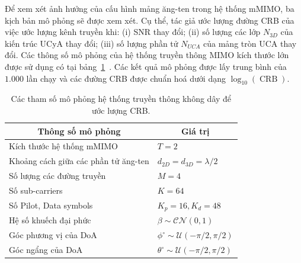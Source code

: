 Để xem xét ảnh hưởng của cấu hình mảng ăng-ten trong hệ thống mMIMO, ba kịch bản mô phỏng sẽ được xem xét. Cụ thể, tác giả ước lượng đường CRB của việc ước lượng kênh truyền khi: (i) SNR thay đổi; (ii) số lượng các lớp $N_{3D}$ của kiến trúc UCyA thay đổi; (iii) số lượng phần tử $N_{UCA}$ của mảng tròn UCA thay đổi. Các thông số mô phỏng của hệ thống truyền thông MIMO kích thước lớn được sử dụng có tại bảng~\ref{tab:simulation_param_CRB}~\cite{Swindlehurst2022}. Các kết quả mô phỏng được lấy trung bình của $1.000$ lần chạy và các đường CRB được chuẩn hoá dưới dạng $\log_{10} (\operatorname{CRB})$.
\begin{table}[ht]
\centering
\caption{Các tham số mô phỏng hệ thống truyền thông không dây để ước lượng CRB.}
\label{tab:simulation_param_CRB}
\begin{tabular}{p{8cm} | p{6cm}}
\hline
\hline
\multicolumn{1}{c|}{\textbf{Thông số mô phỏng}} & \multicolumn{1}{c}{\textbf{Giá trị}} \\ \hline
Kích thước hệ thống mMIMO                            & $T = 2$      \\ \hline
Khoảng cách giữa các phần tử ăng-ten                 & $d_{2D} = d_{3D} = \lambda / 2$ \\ \hline
Số lượng các đường truyền                   & $M = 4$      \\ \hline
Số sub-carriers                    & $K = 64$     \\ \hline
Số Pilot, Data symbols                          & $K_p = 16, K_d = 48$     \\ \hline
Hệ số khuếch đại phức               & $\beta \sim \mathcal{C} \mathcal{N}\left(0, 1 \right)$     \\ \hline
Góc phương vị của DoA            & $\phi^\circ \sim \mathcal{U}(-\pi/2, \pi/2)$        \\ \hline
Góc ngẩng của DoA           & $\theta^\circ \sim \mathcal{U}(-\pi/2, \pi/2)$       \\ \hline
\end{tabular}
\end{table}
